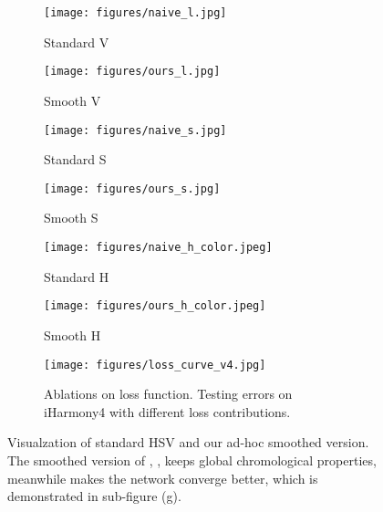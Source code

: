 \documentclass[runningheads]{llncs}
\begin{document}
    \begin{figure}[!thb]
        \centering
    \begin{minipage}[t]{0.35\textwidth}
        \centering
        \begin{subfigure}[t]{0.47\linewidth}
            \centering
            \texttt{[image: figures/naive\_l.jpg]}
            \caption{Standard V}\label{fig:std-l}
        \end{subfigure}
        \begin{subfigure}[t]{0.47\linewidth}
            \centering
            \texttt{[image: figures/ours\_l.jpg]}
            \caption{Smooth V}\label{fig:smo-l}		
        \end{subfigure}

        \begin{subfigure}[t]{0.47\linewidth}
            \centering
            \texttt{[image: figures/naive\_s.jpg]}
            \caption{Standard S}\label{fig:std-s}
        \end{subfigure}
        \begin{subfigure}[t]{0.47\linewidth}
            \centering
            \texttt{[image: figures/ours\_s.jpg]}
            \caption{Smooth S}\label{fig:smo-s}
        \end{subfigure}

        \begin{subfigure}[t]{0.47\linewidth}
            \centering
            \texttt{[image: figures/naive\_h\_color.jpeg]}
            \caption{Standard H}\label{fig:std-h}
        \end{subfigure}
        \begin{subfigure}[t]{0.47\linewidth}
            \centering
            \texttt{[image: figures/ours\_h\_color.jpeg]}
            \caption{Smooth H}\label{fig:smo-h}
        \end{subfigure}
    \end{minipage}
    \begin{minipage}[t]{0.57\textwidth}
        \centering
        \vspace{-45pt}
        \begin{subfigure}[t] {1\linewidth}
            \centering
            \texttt{[image: figures/loss\_curve\_v4.jpg]}
            \caption{
                Ablations on loss function.
            Testing errors on iHarmony4 with different loss contributions.
            } 
            \label{fig:loss_curve}
        \end{subfigure}
    \end{minipage}
    
        \caption{
Visualzation of standard HSV and our ad-hoc smoothed version. The smoothed version of , ,  keeps global chromological properties, meanwhile makes the network converge better, which is demonstrated in sub-figure (g).}
    
    \label{fig:hslmap}
    \end{figure}
    
\end{document}
